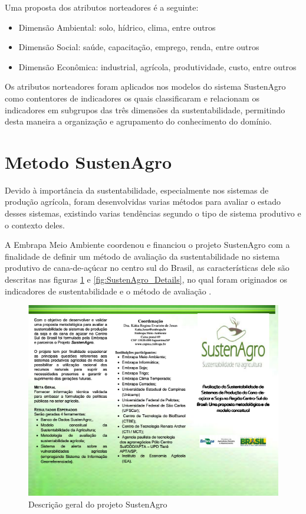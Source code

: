 Uma proposta dos atributos norteadores é a seguinte:
\begin{itemize}
\item Dimensão Ambiental: solo, hídrico, clima, entre outros
\item Dimensão Social: saúde, capacitação, emprego, renda, entre outros
\item Dimensão Econômica: industrial, agrícola, produtividade, custo, entre
outros
\end{itemize}
Os atributos norteadores foram aplicados nos modelos do sistema SustenAgro
como contentores de indicadores os quais classificaram e relacionam
os indicadores em subgrupos das três dimensões da sustentabilidade,
permitindo desta maneira a organização e agrupamento do conhecimento
do domínio.

\section{Metodo SustenAgro}

Devido à importância da sustentabilidade, especialmente nos sistemas
de produção agrícola, foram desenvolvidas varias métodos para avaliar
o estado desses sistemas, existindo varias tendências segundo o tipo
de sistema produtivo e o contexto deles.

A Embrapa Meio Ambiente coordenou e financiou o projeto SustenAgro
com a finalidade de definir um método de avaliação da sustentabilidade
no sistema produtivo de cana-de-açúcar no centro sul do Brasil, as
características dele são descritas nas figuras \ref{fig:SustenAgro_Description}
e \ref{fig:SustenAgro_Details}, no qual foram originados os indicadores
de sustentabilidade e o método de avaliação \citep{oliveira:2013,BRUMATTI:2015}.

\vfill{}

\pagebreak{}

\begin{figure}[H]
\begin{centering}
\includegraphics[width=1\columnwidth]{figures/folderEmbrapa1}
\par\end{centering}
\caption{Descrição geral do projeto SustenAgro \label{fig:SustenAgro_Description}}
\end{figure}

